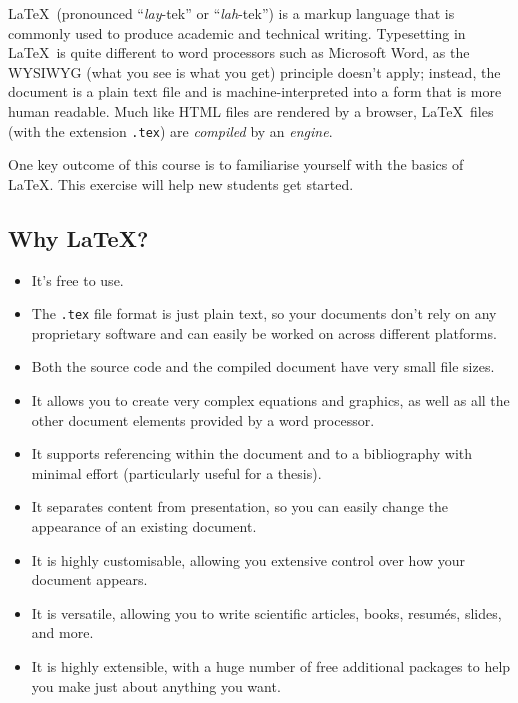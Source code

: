 \documentclass[12pt]{article}
\begin{document}

\LaTeX\ (pronounced ``\emph{lay}-tek'' or ``\emph{lah}-tek'') is a markup language that is commonly used to produce academic and technical writing. Typesetting in \LaTeX\ is quite different to word processors such as Microsoft Word, as the WYSIWYG (what you see is what you get) principle doesn't apply; instead, the document is a plain text file and is machine-interpreted into a form that is more human readable. Much like HTML files are rendered by a browser, \LaTeX\ files (with the extension \texttt{.tex}) are \emph{compiled} by an \emph{engine}.

One key outcome of this course is to familiarise yourself with the basics of \LaTeX. This exercise will help new students get started.

\subsection*{Why \LaTeX?}

\begin{itemize}
\item It's free to use.
\item The \texttt{.tex} file format is just plain text, so your documents don't rely on any proprietary software and can easily be worked on across different platforms.
\item Both the source code and the compiled document have very small file sizes.
\item It allows you to create very complex equations and graphics, as well as all the other document elements provided by a word processor.
\item It supports referencing within the document and to a bibliography with minimal effort (particularly useful for a thesis).
\item It separates content from presentation, so you can easily change the appearance of an existing document.
\item It is highly customisable, allowing you extensive control over how your document appears.
\item It is versatile, allowing you to write scientific articles, books, resum\'{e}s, slides, and more.
\item It is highly extensible, with a huge number of free additional packages to help you make just about anything you want.
\end{itemize}
\end{document}

